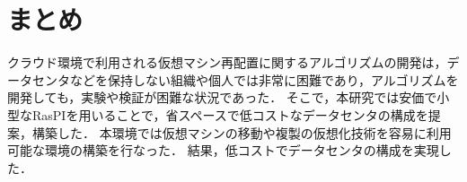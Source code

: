 \documentclass[submit,techrep]{ipsj}
\begin{document}


\section{まとめ}

クラウド環境で利用される仮想マシン再配置に関するアルゴリズムの開発は，データセンタなどを保持しない組織や個人では非常に困難であり，アルゴリズムを開発しても，実験や検証が困難な状況であった．
そこで，本研究では安価で小型なRasPIを用いることで，省スペースで低コストなデータセンタの構成を提案，構築した．
本環境では仮想マシンの移動や複製の仮想化技術を容易に利用可能な環境の構築を行なった．
結果，低コストでデータセンタの構成を実現した．
\end{document}
